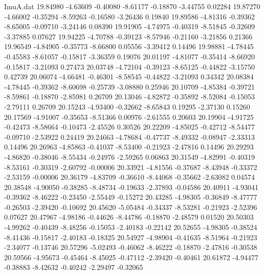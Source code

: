 \begin{filecontents}{ImuA.dat}
  19.84980   -4.63609   -0.40080   -8.61177   -0.18870   -3.44755    0.02284
  19.87270   -4.66002   -0.35294   -8.59263   -0.16580   -3.26436    0.19840
  19.89586   -4.81316   -0.39362   -8.65005   -0.09710   -3.24146    0.08390
  19.91905   -4.74975   -0.40319   -8.51845   -0.32609   -3.37885    0.07627
  19.94225   -4.70788   -0.39123   -8.57946   -0.21160   -3.21856    0.21366
  19.96549   -4.84905   -0.35773   -8.66800    0.05556   -3.39412    0.14496
  19.98881   -4.78445   -0.45583   -8.61057   -0.15817   -3.36359    0.19076
  20.01197   -4.81077   -0.35414   -8.66920   -0.15817   -3.21093    0.27473
  20.03748   -4.72104   -0.39123   -8.65125   -0.44822   -3.15750    0.42739
  20.06074   -4.66481   -0.46301   -8.58545   -0.44822   -3.21093    0.34342
  20.08384   -4.78445   -0.39362   -8.60698   -0.25739   -3.08880    0.25946
  20.10709   -4.85384   -0.39721   -8.59861   -0.18870   -2.85981    0.26709
  20.13046   -4.82872   -0.35892   -8.52084   -0.15053   -2.79111    0.26709
  20.15243   -4.93400   -0.32662   -8.65843    0.19295   -2.37130    0.15260
  20.17569   -4.91007   -0.35653   -8.51366    0.00976   -2.61555    0.20603
  20.19904   -4.91725   -0.42473   -8.58664   -0.10473   -2.45526    0.30526
  20.22209   -4.85025   -0.42712   -8.54477   -0.09710   -2.53922    0.24419
  20.24663   -4.78684   -0.47737   -8.49332   -0.08947   -2.33313    0.14496
  20.26963   -4.85863   -0.41037   -8.53400   -0.21923   -2.47816    0.14496
  20.29293   -4.86820   -0.38046   -8.55434   -0.24976   -2.59265    0.06863
  20.31549   -4.82991   -0.40319   -8.53161   -0.30319   -2.60792   -0.00006
  20.33921   -4.81556   -0.37687   -8.43948   -0.33372   -2.53159   -0.00006
  20.36179   -4.83709   -0.36610   -8.44068   -0.35662   -2.63082    0.04574
  20.38548   -4.90050   -0.38285   -8.48734   -0.19633   -2.37893   -0.04586
  20.40911   -4.93041   -0.39362   -8.46222   -0.23450   -2.55449   -0.15272
  20.43285   -4.98305   -0.36849   -8.47777   -0.26503   -2.39420   -0.10692
  20.45620   -5.05484   -0.34337   -8.53281   -0.21923   -2.52396    0.07627
  20.47967   -4.98186   -0.44626   -8.44786   -0.18870   -2.48579    0.01520
  20.50303   -4.99262   -0.40439   -8.48256   -0.15053   -2.40183   -0.22142
  20.52655   -4.98305   -0.38524   -8.41436   -0.15817   -2.40183   -0.18325
  20.54927   -4.98904   -0.41635   -8.51964   -0.21923   -2.34077   -0.13746
  20.57296   -5.02493   -0.46062   -8.46222   -0.18870   -2.47816   -0.30538
  20.59566   -4.95673   -0.45464   -8.45025   -0.47112   -2.39420   -0.40461
  20.61872   -4.94477   -0.38883   -8.42632   -0.40242   -2.29497   -0.32065

\end{filecontents}
